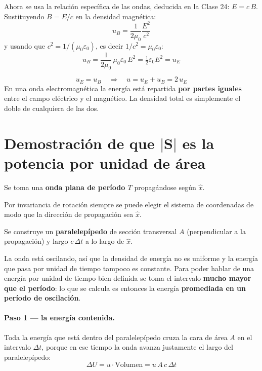 \documentclass[12pt,a4paper]{article}
\begin{document}
Ahora se usa la relación específica de las ondas, deducida en la Clase 24:
$E = c\,B$. Sustituyendo $B = E/c$ en la densidad magnética:
\[
u_B = \frac{1}{2\mu_0}\frac{E^2}{c^2}
\]
y usando que $c^2 = 1/(\mu_0\varepsilon_0)$, es decir
$1/c^2 = \mu_0\varepsilon_0$:
\[
u_B = \frac{1}{2\mu_0}\,\mu_0\varepsilon_0\, E^2
    = \tfrac{1}{2}\varepsilon_0 E^2 = u_E
\]

\begin{keybox}
\[
\boxed{\ u_E = u_B \quad\Longrightarrow\quad u = u_E + u_B = 2\,u_E\ }
\]
En una onda electromagnética la energía está repartida \textbf{por partes
iguales} entre el campo eléctrico y el magnético. La densidad total es simplemente
el doble de cualquiera de las dos.
\end{keybox}

\section{Demostración de que $|\mathbf{S}|$ es la potencia por unidad de área}

Se toma una \textbf{onda plana de período $T$} propagándose según $\hat{x}$.

\begin{notebox}
Por invariancia de rotación siempre se puede elegir el sistema de coordenadas de
modo que la dirección de propagación sea $\hat{x}$.
\end{notebox}

Se construye un \textbf{paralelepípedo} de sección transversal $A$ (perpendicular
a la propagación) y largo $c\,\Delta t$ a lo largo de $\hat{x}$.

\begin{warnbox}
La onda está oscilando, así que la densidad de energía no es uniforme y la energía
que pasa por unidad de tiempo tampoco es constante. Para poder hablar de una
energía por unidad de tiempo bien definida se toma el intervalo \textbf{mucho
mayor que el período}: lo que se calcula es entonces la energía \textbf{promediada
en un período de oscilación}.
\end{warnbox}

\paragraph{Paso 1 --- la energía contenida.}
Toda la energía que está dentro del paralelepípedo cruza la cara de área $A$ en el
intervalo $\Delta t$, porque en ese tiempo la onda avanza justamente el largo del
paralelepípedo:
\[
\Delta U = u \cdot \text{Volumen} = u\, A\, c\, \Delta t
\]
\end{document}
